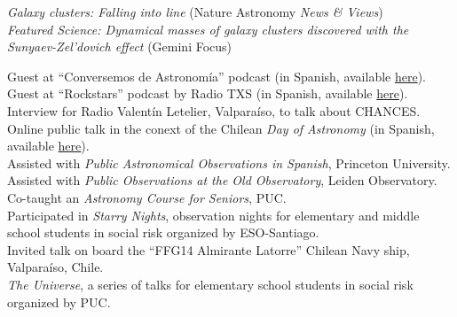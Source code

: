 \documentclass[11pt]{article}
\begin{document}



\noindent
 \emph{Galaxy clusters: Falling into line} (Nature Astronomy \emph{News \& Views})\\
 \emph{Featured Science: Dynamical masses of galaxy clusters discovered with the Sunyaev-Zel'dovich effect} (Gemini Focus)


\noindent
{} Guest at ``Conversemos de Astronomía'' podcast (in Spanish, available \href{https://open.spotify.com/episode/4PBTlnI3ufDtBwXIGee5mp?si=KGS43HFnSuiVdVPYaoBMqA}{here}).\\
 Guest at ``Rockstars'' podcast by Radio TXS (in Spanish, available \href{https://soundcloud.com/txsplus/rockstars-con-gabriel-leon-y-cristobal-sifon-4-de-noviembre-del-2022?utm_source=Email&utm_campaign=social_sharing&utm_medium=widgetutm_content=https%3A%2F%2Fsoundcloud.com%2Ftxsplus%2Frockstars-con-gabriel-leon-y-cristobal-sifon-4-de-noviembre-del-2022}{here}).\\
 Interview for Radio Valent\'in Letelier, Valparaíso, to talk about CHANCES.\\
 Online public talk in the conext of the Chilean \textit{Day of Astronomy} (in Spanish, available \href{https://www.youtube.com/watch?v=MgrKSd6JWkE}{here}).\\
 Assisted with \emph{Public Astronomical Observations in Spanish}, Princeton University.\\
 Assisted with \emph{Public Observations at the Old Observatory}, Leiden Observatory.\\
 Co-taught an \emph{Astronomy Course for Seniors}, PUC.\\
 Participated in \emph{Starry Nights}, observation nights for 
elementary and middle school students in social risk organized by ESO-Santiago.\\
 Invited talk on board the ``FFG14 Almirante Latorre'' Chilean Navy ship, Valpara\'iso, Chile.\\
 \emph{The Universe}, a series of talks for elementary school students in social risk organized by PUC.\\
\end{document}
